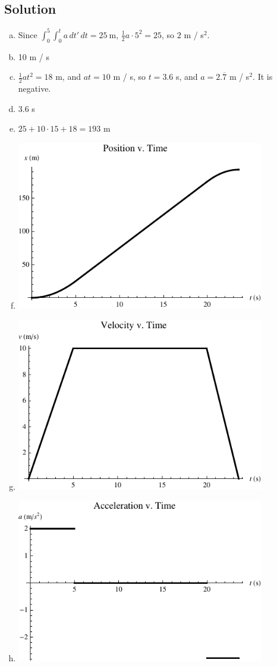 \documentclass[solutions]{esg8012pset}
\begin{document}
\subsection*{Solution}
  \begin{enumerate}[a)]
    \item Since $\displaystyle \int_{0}^{5}\int_{0}^{t} a \,d{t'}\,d{t} = 25\ \text{m}$, $\frac{1}{2}a \cdot 5^2 = 25$, so $2$ m / s$^2$.
    \item 10 m / s
    \item $\frac{1}{2}at^2 = 18$ m, and $at = 10$ m / s, so $t = 3.6$ s, and $a = 2.\overline{7}$ m / s$^2$.  It is negative.
    \item 3.6 s
    \item $25 + 10 \cdot 15 + 18 = 193$ m
    \item \includegraphics[width=0.85\textwidth]{ps01_Plot_1}
    \item \includegraphics[width=0.85\textwidth]{ps01_Plot_2}
    \item \includegraphics[width=0.85\textwidth]{ps01_Plot_3}
  \end{enumerate}
\end{document}
